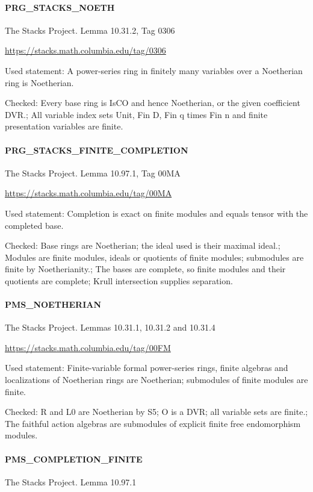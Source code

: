 \paragraph{PRG\_\allowbreak{}STACKS\_\allowbreak{}NOETH}The Stacks Project. Lemma 10.31.2, Tag 0306

\url{https://stacks.math.columbia.edu/tag/0306}

Used statement: A power-series ring in finitely many variables over a Noetherian ring is Noetherian.

Checked: Every base ring is IsCO and hence Noetherian, or the given coefficient DVR.; All variable index sets Unit, Fin D, Fin q times Fin n and finite presentation variables are finite.

\paragraph{PRG\_\allowbreak{}STACKS\_\allowbreak{}FINITE\_\allowbreak{}COMPLETION}The Stacks Project. Lemma 10.97.1, Tag 00MA

\url{https://stacks.math.columbia.edu/tag/00MA}

Used statement: Completion is exact on finite modules and equals tensor with the completed base.

Checked: Base rings are Noetherian; the ideal used is their maximal ideal.; Modules are finite modules, ideals or quotients of finite modules; submodules are finite by Noetherianity.; The bases are complete, so finite modules and their quotients are complete; Krull intersection supplies separation.

\paragraph{PMS\_\allowbreak{}NOETHERIAN}The Stacks Project. Lemmas 10.31.1, 10.31.2 and 10.31.4

\url{https://stacks.math.columbia.edu/tag/00FM}

Used statement: Finite-variable formal power-series rings, finite algebras and localizations of Noetherian rings are Noetherian; submodules of finite modules are finite.

Checked: R and L0 are Noetherian by S5; O is a DVR; all variable sets are finite.; The faithful action algebras are submodules of explicit finite free endomorphism modules.

\paragraph{PMS\_\allowbreak{}COMPLETION\_\allowbreak{}FINITE}The Stacks Project. Lemma 10.97.1

